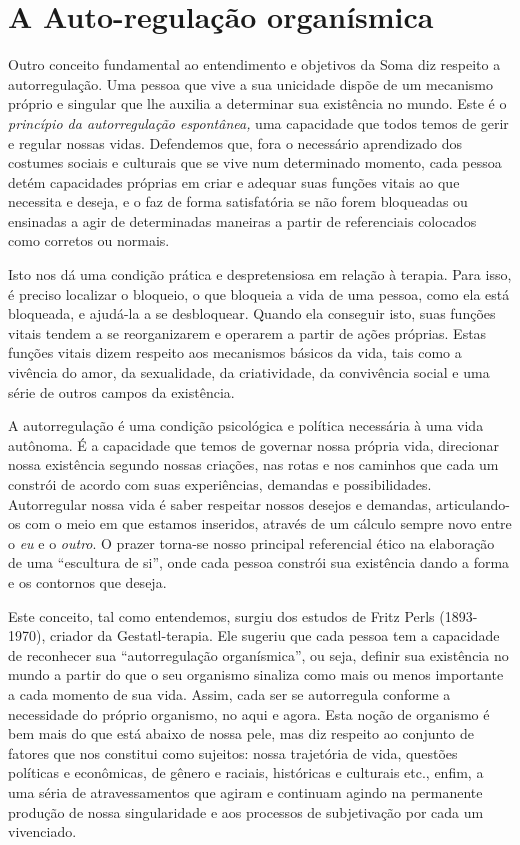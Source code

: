 \section{A Auto-regulação organísmica}

Outro conceito fundamental ao entendimento e objetivos da Soma diz
respeito a autorregulação. Uma pessoa que vive a sua unicidade dispõe de
um mecanismo próprio e singular que lhe auxilia a determinar sua
existência no mundo. Este é o \emph{princípio da autorregulação
espontânea,} uma capacidade que todos temos de gerir e regular nossas
vidas. Defendemos que, fora o necessário aprendizado dos costumes
sociais e culturais que se vive num determinado momento, cada pessoa
detém capacidades próprias em criar e adequar suas funções vitais ao que
necessita e deseja, e o faz de forma satisfatória se não forem
bloqueadas ou ensinadas a agir de determinadas maneiras a partir de
referenciais colocados como corretos ou normais.

Isto nos dá uma condição prática e despretensiosa em relação à terapia.
Para isso, é preciso localizar o bloqueio, o que bloqueia a vida de uma
pessoa, como ela está bloqueada, e ajudá-la a se desbloquear. Quando ela
conseguir isto, suas funções vitais tendem a se reorganizarem e operarem
a partir de ações próprias. Estas funções vitais dizem respeito aos
mecanismos básicos da vida, tais como a vivência do amor, da
sexualidade, da criatividade, da convivência social e uma série de
outros campos da existência.

A autorregulação é uma condição psicológica e política necessária à uma
vida autônoma. É a capacidade que temos de governar nossa própria vida,
direcionar nossa existência segundo nossas criações, nas rotas e nos
caminhos que cada um constrói de acordo com suas experiências, demandas
e possibilidades. Autorregular nossa vida é saber respeitar nossos
desejos e demandas, articulando-os com o meio em que estamos inseridos,
através de um cálculo sempre novo entre o \emph{eu} e o \emph{outro}. O
prazer torna-se nosso principal referencial ético na elaboração de uma
``escultura de si'', onde cada pessoa constrói sua existência dando a
forma e os contornos que deseja.

Este conceito, tal como entendemos, surgiu dos estudos de Fritz Perls
(1893-1970), criador da Gestatl-terapia. Ele sugeriu que cada pessoa tem
a capacidade de reconhecer sua ``autorregulação organísmica'', ou seja,
definir sua existência no mundo a partir do que o seu organismo sinaliza
como mais ou menos importante a cada momento de sua vida. Assim, cada
ser se autorregula conforme a necessidade do próprio organismo, no aqui
e agora. Esta noção de organismo é bem mais do que está abaixo de nossa
pele, mas diz respeito ao conjunto de fatores que nos constitui como
sujeitos: nossa trajetória de vida, questões políticas e econômicas, de
gênero e raciais, históricas e culturais etc., enfim, a uma séria de
atravessamentos que agiram e continuam agindo na permanente produção de
nossa singularidade e aos processos de subjetivação por cada um
vivenciado.

